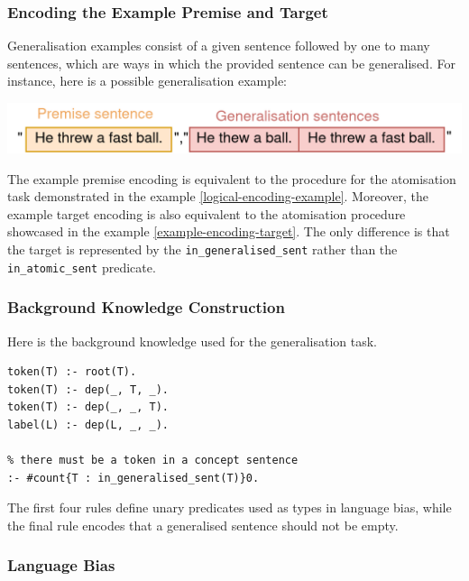 \subsubsection{Encoding the Example Premise and Target}

Generalisation examples consist of a given sentence followed by one to many sentences, which are ways in which the provided sentence can be generalised.
For instance, here is a possible generalisation example:
\begin{center}
\setlength\parskip{0pt}
\includegraphics[width=.8\linewidth]{solving-nlp-tasks-logically/raw-generalisation-example.png}
\end{center}

The example premise encoding is equivalent to the procedure for the atomisation task demonstrated in the example \ref{logical-encoding-example}.
Moreover, the example target encoding is also equivalent to the atomisation procedure showcased in the example \ref{example-encoding-target}.
The only difference is that the target is represented by the \verb+in_generalised_sent+ rather than the \verb+in_atomic_sent+ predicate.


\subsubsection{Background Knowledge Construction}

Here is the background knowledge used for the generalisation task.
\begin{verbatim}
token(T) :- root(T).
token(T) :- dep(_, T, _).
token(T) :- dep(_, _, T).
label(L) :- dep(L, _, _).

% there must be a token in a concept sentence
:- #count{T : in_generalised_sent(T)}0.
\end{verbatim}
The first four rules define unary predicates used as types in language bias, while the final rule encodes that a generalised sentence should not be empty.

\subsubsection{Language Bias}

